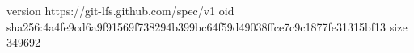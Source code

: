 version https://git-lfs.github.com/spec/v1
oid sha256:4a4fe9cd6a9f91569f738294b399bc64f59d49038ffce7c9c1877fe31315bf13
size 349692
